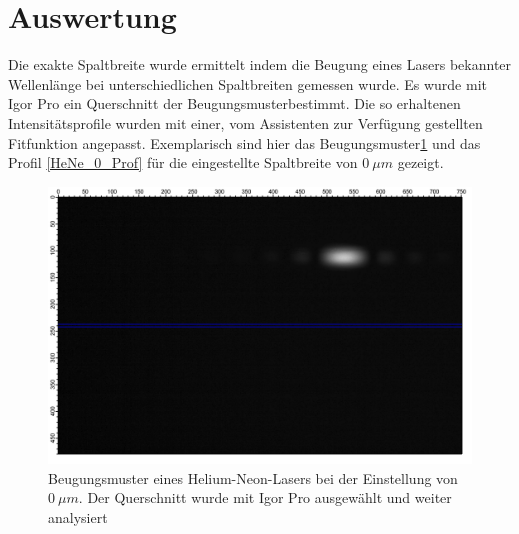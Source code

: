 %
%
\section {Auswertung}
Die exakte Spaltbreite wurde ermittelt indem die Beugung eines Lasers bekannter Wellenlänge bei unterschiedlichen Spaltbreiten gemessen wurde. Es wurde mit Igor Pro ein Querschnitt der Beugungsmusterbestimmt. Die so erhaltenen Intensitätsprofile wurden mit einer, vom Assistenten zur Verfügung gestellten Fitfunktion angepasst. Exemplarisch sind hier das Beugungsmuster\ref{HeNe_0} und das Profil \ref{HeNe_0_Prof} für die eingestellte Spaltbreite von $0~\mu m$ gezeigt.

\begin{figure}[H]
	\centering	
	\begin{minipage}{1\textwidth}
		\includegraphics[width=\columnwidth]{180618/Graph0.png}
	\end{minipage}
	\caption{Beugungsmuster eines Helium-Neon-Lasers bei der Einstellung von $0~\mu m$. Der Querschnitt wurde mit Igor Pro ausgewählt und weiter analysiert }
	\label{HeNe_0}
\end{figure}


